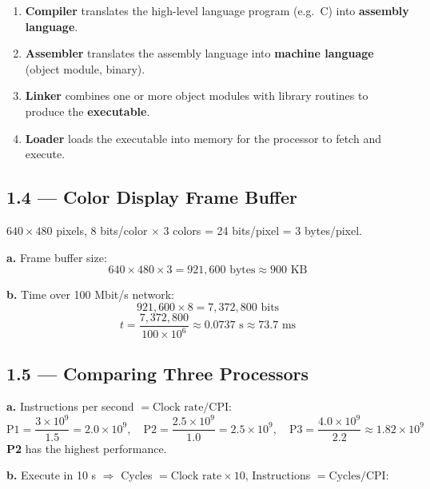 \begin{enumerate}
  \item \textbf{Compiler} translates the high-level language program (e.g.\ C)
        into \textbf{assembly language}.
  \item \textbf{Assembler} translates the assembly language into
        \textbf{machine language} (object module, binary).
  \item \textbf{Linker} combines one or more object modules with library
        routines to produce the \textbf{executable}.
  \item \textbf{Loader} loads the executable into memory for the processor
        to fetch and execute.
\end{enumerate}

\subsection*{1.4 --- Color Display Frame Buffer}
\hypertarget{sol-1.4}{}

$640 \times 480$ pixels, 8 bits/color $\times$ 3 colors = 24 bits/pixel = 3 bytes/pixel.

\medskip\noindent\textbf{a.} Frame buffer size:
\[
  640 \times 480 \times 3 = 921{,}600 \text{ bytes} \approx 900 \text{ KB}
\]

\noindent\textbf{b.} Time over 100 Mbit/s network:
\[
  921{,}600 \times 8 = 7{,}372{,}800 \text{ bits}
\]
\[
  t = \frac{7{,}372{,}800}{100 \times 10^6} \approx 0.0737 \text{ s}
  \approx 73.7 \text{ ms}
\]

\subsection*{1.5 --- Comparing Three Processors}
\hypertarget{sol-1.5}{}

\noindent\textbf{a.} Instructions per second $= \text{Clock rate} / \text{CPI}$:
\[
  \text{P1} = \frac{3 \times 10^9}{1.5} = 2.0 \times 10^9, \quad
  \text{P2} = \frac{2.5 \times 10^9}{1.0} = 2.5 \times 10^9, \quad
  \text{P3} = \frac{4.0 \times 10^9}{2.2} \approx 1.82 \times 10^9
\]
\textbf{P2} has the highest performance.

\medskip\noindent\textbf{b.} Execute in 10 s $\Rightarrow$
Cycles $= \text{Clock rate} \times 10$, \quad
Instructions $= \text{Cycles} / \text{CPI}$:

